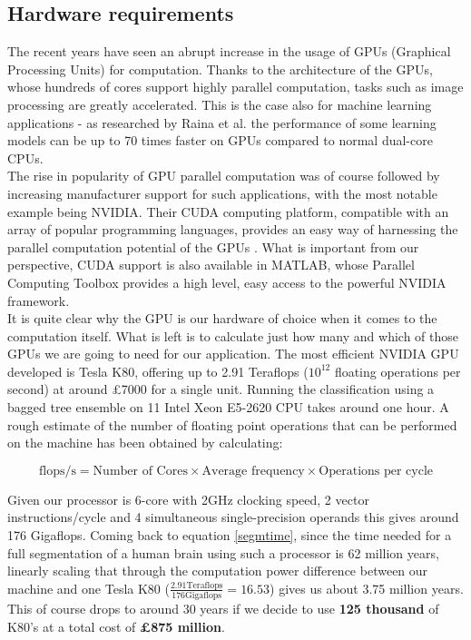 \documentclass[a4paper, 11pt]{article}
\numberwithin{equation}{section}
\begin{document}
		\subsection{Hardware requirements}
		\label{Hardware}
		The recent years have seen an abrupt increase in the usage of GPUs (Graphical Processing Units) for computation. Thanks to the architecture of the GPUs, whose hundreds of cores support highly parallel computation, tasks such as image processing are greatly accelerated. This is the case also for machine learning applications - as researched by Raina et al. \cite{raina2009large} the performance of some learning models can be up to 70 times faster on GPUs compared to normal dual-core CPUs.\\
		
		\noindent The rise in popularity of GPU parallel computation was of course followed by increasing manufacturer support for such applications, with the most notable example being NVIDIA. Their CUDA computing platform, compatible with an array of popular programming languages, provides an easy way of harnessing the parallel computation potential of the GPUs \cite{nvidia2016cuda}. What is important from our perspective, CUDA support is also available in MATLAB, whose Parallel Computing Toolbox \cite{matlab2016cuda} provides a high level, easy access to the powerful NVIDIA framework.\\
		
		\noindent It is quite clear why the GPU is our hardware of choice when it comes to the computation itself. What is left is to calculate just how many and which of those GPUs we are going to need for our application. The most efficient NVIDIA GPU developed is Tesla K80, offering up to 2.91 Teraflops ($10^{12}$ floating operations per second) at around \pounds 7000 for a single unit. Running the classification using a bagged tree ensemble on 11 Intel Xeon E5-2620 CPU takes around one hour. A rough estimate of the number of floating point operations that can be performed on the machine has been obtained by calculating:
		
		\begin{equation}
		\textrm{flops/s} = \textrm{Number of Cores} \times \textrm{Average frequency} \times \textrm{Operations per cycle}
		\end{equation}
		
		\noindent Given our processor is 6-core with 2GHz clocking speed, 2 vector instructions/cycle and 4 simultaneous single-precision operands \cite{so2016flops} this gives around 176 Gigaflops. Coming back to equation \ref{segmtime}, since the time needed for a full segmentation of a human brain using such a processor is 62 million years, linearly scaling that through the computation power difference between our machine and one Tesla K80 ($\frac{2.91 \textrm{Teraflops}}{176 \textrm{Gigaflops}} = 16.53$) gives us about 3.75 million years. This of course drops to around 30 years if we decide to use \textbf{125 thousand} of K80's at a total cost of \textbf{\pounds 875 million}.  
		
\end{document}
